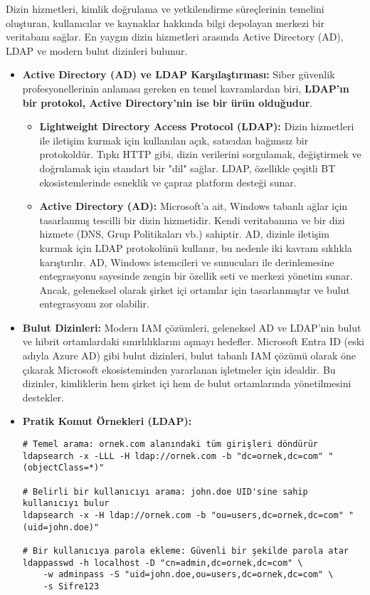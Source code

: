 Dizin hizmetleri, kimlik doğrulama ve yetkilendirme süreçlerinin temelini oluşturan, kullanıcılar ve kaynaklar hakkında bilgi depolayan merkezi bir veritabanı sağlar. En yaygın dizin hizmetleri arasında Active Directory (AD), LDAP ve modern bulut dizinleri bulunur.

\begin{itemize}
    \item \textbf{Active Directory (AD) ve LDAP Karşılaştırması:} Siber güvenlik profesyonellerinin anlaması gereken en temel kavramlardan biri, \textbf{LDAP'ın bir protokol, Active Directory'nin ise bir ürün olduğudur}.
    \begin{itemize}
        \item \textbf{Lightweight Directory Access Protocol (LDAP):} Dizin hizmetleri ile iletişim kurmak için kullanılan açık, satıcıdan bağımsız bir protokoldür. Tıpkı HTTP gibi, dizin verilerini sorgulamak, değiştirmek ve doğrulamak için standart bir "dil" sağlar. LDAP, özellikle çeşitli BT ekosistemlerinde esneklik ve çapraz platform desteği sunar.
        \item \textbf{Active Directory (AD):} Microsoft'a ait, Windows tabanlı ağlar için tasarlanmış tescilli bir dizin hizmetidir. Kendi veritabanına ve bir dizi hizmete (DNS, Grup Politikaları vb.) sahiptir. AD, dizinle iletişim kurmak için LDAP protokolünü kullanır, bu nedenle iki kavram sıklıkla karıştırılır. AD, Windows istemcileri ve sunucuları ile derinlemesine entegrasyonu sayesinde zengin bir özellik seti ve merkezi yönetim sunar. Ancak, geleneksel olarak şirket içi ortamlar için tasarlanmıştır ve bulut entegrasyonu zor olabilir.
    \end{itemize}
    \item \textbf{Bulut Dizinleri:} Modern IAM çözümleri, geleneksel AD ve LDAP'nin bulut ve hibrit ortamlardaki sınırlılıklarını aşmayı hedefler. Microsoft Entra ID (eski adıyla Azure AD) gibi bulut dizinleri, bulut tabanlı IAM çözümü olarak öne çıkarak Microsoft ekosisteminden yararlanan işletmeler için idealdir. Bu dizinler, kimliklerin hem şirket içi hem de bulut ortamlarında yönetilmesini destekler.
    
    \item \textbf{Pratik Komut Örnekleri (LDAP):}
\begin{verbatim}
# Temel arama: ornek.com alanındaki tüm girişleri döndürür
ldapsearch -x -LLL -H ldap://ornek.com -b "dc=ornek,dc=com" "(objectClass=*)"

# Belirli bir kullanıcıyı arama: john.doe UID'sine sahip kullanıcıyı bulur
ldapsearch -x -H ldap://ornek.com -b "ou=users,dc=ornek,dc=com" "(uid=john.doe)"

# Bir kullanıcıya parola ekleme: Güvenli bir şekilde parola atar
ldappasswd -h localhost -D "cn=admin,dc=ornek,dc=com" \
    -w adminpass -S "uid=john.doe,ou=users,dc=ornek,dc=com" \
    -s Sifre123
\end{verbatim}
\end{itemize}

